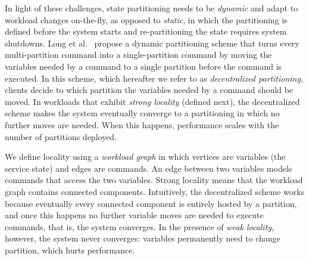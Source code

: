 In light of these challenges, state partitioning needs to be
\emph{dynamic} and adapt to workload changes on-the-fly, as opposed to
\emph{static}, in which the partitioning is defined before the system
starts and re-partitioning the state requires system shutdowns.  Long
et al.~\cite{hoang2016} propose a dynamic partitioning scheme that
turns every multi-partition command into a single-partition command by
moving the variables needed by a command to a single partition before
the command is executed.  In this scheme, which hereafter we refer to
as \emph{decentralized partitioning}, clients decide to which
partition the variables needed by a command should be moved.  In
workloads that exhibit \emph{strong locality} (defined next), the
decentralized scheme makes the system eventually converge to a
partitioning in which no further moves are needed.  When this happens,
performance scales with the number of partitions deployed.








We define locality using a \emph{workload graph} in which vertices are
variables (the service state) and edges are commands.
An edge between two variables models commands that access the two
variables.  Strong locality means that the workload graph contains
connected components.  Intuitively, the decentralized scheme works
because eventually every connected component is entirely hosted by a
partition, and once this happens no further variable moves are needed to
execute commands, that is, the system converges.  In the presence of
\emph{weak locality}, however, the system never converges: variables
permanently need to change partition, which hurts performance.

